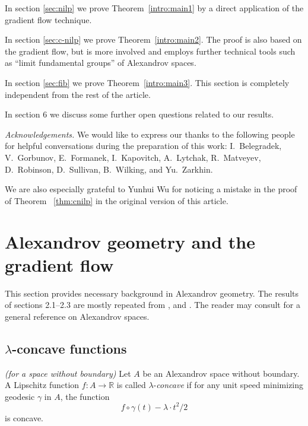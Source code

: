 \documentclass{amsart}
\begin{document}
In section \ref{sec:nilp} we prove Theorem~\ref{intro:main1} by a direct application of the gradient flow technique.

In section \ref{sec:c-nilp} we  prove Theorem~\ref{intro:main2}.
The proof is also based on the gradient flow, but
is more involved and employs further technical tools such as
``limit fundamental groups'' of Alexandrov spaces.

In section \ref{sec:fib} we prove Theorem~\ref{intro:main3}.
This section is completely independent from the rest of the article.

In section 6 we discuss some further open questions related to our results.

\smallskip

{\it Acknowledgements.}
We would like to express our thanks to the following people
for helpful conversations during the preparation of this work:
I.~Belegradek,
V.~Gorbunov, E.~Formanek, I.~Kapovitch, A.~Lytchak, R.~Matveyev, D.~Robinson,
D.~Sullivan,  B.~Wilking, and Yu.~Zarkhin.

We are also especially grateful to Yunhui Wu for noticing a mistake
in the  proof of Theorem ~\ref{thm:cnilp} in the original version of
this article.

\section{ Alexandrov geometry and the gradient flow}\label{s:gradpush}

This section
provides necessary background in Alexandrov geometry.
The results of sections 2.1--2.3 are mostly  repeated from  \cite{PP}, \cite{Ptr2} and \cite{Ptr2007}.
The reader may consult \cite{BGP} for a general reference on Alexandrov spaces.


\subsection{$\lambda$-concave functions}


\begin{defn}{\it (for a space without boundary)} Let $A$ be an Alexandrov space without boundary.
A Lipschitz function $f\colon A \rightarrow \mathbb{R}$ is called
$\lambda$-\emph{concave} if for any unit speed minimizing geodesic $\gamma$
in $A$, the function
$$f\circ\gamma(t)-\lambda{\cdot}  t^2/2$$
is concave.
\end{defn}
\end{document}
